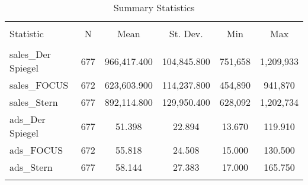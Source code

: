 
\begin{table}[!htbp] \centering 
  \caption{Summary Statistics} 
  \label{t_sum_fss} 
\begin{tabular}{@{\extracolsep{5pt}}lccccc} 
\\[-1.8ex]\hline 
\hline \\[-1.8ex] 
Statistic & \multicolumn{1}{c}{N} & \multicolumn{1}{c}{Mean} & \multicolumn{1}{c}{St. Dev.} & \multicolumn{1}{c}{Min} & \multicolumn{1}{c}{Max} \\ 
\hline \\[-1.8ex] 
sales\_Der Spiegel & 677 & 966,417.400 & 104,845.800 & 751,658 & 1,209,933 \\ 
sales\_FOCUS & 672 & 623,603.900 & 114,237.800 & 454,890 & 941,870 \\ 
sales\_Stern & 677 & 892,114.800 & 129,950.400 & 628,092 & 1,202,734 \\ 
ads\_Der Spiegel & 677 & 51.398 & 22.894 & 13.670 & 119.910 \\ 
ads\_FOCUS & 672 & 55.818 & 24.508 & 15.000 & 130.500 \\ 
ads\_Stern & 677 & 58.144 & 27.383 & 17.000 & 165.750 \\ 
\hline \\[-1.8ex] 
\end{tabular} 
\end{table} 
